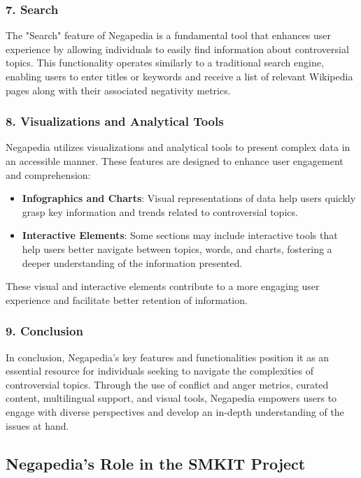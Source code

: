 \subsubsection{7. Search}

The "Search" feature of Negapedia is a fundamental tool that enhances user experience by allowing individuals to easily find information about controversial topics. This functionality operates similarly to a traditional search engine, enabling users to enter titles or keywords and receive a list of relevant Wikipedia pages along with their associated negativity metrics.

\subsubsection{8. Visualizations and Analytical Tools}

Negapedia utilizes visualizations and analytical tools to present complex data in an accessible manner. These features are designed to enhance user engagement and comprehension:

\begin{itemize}
    \item \textbf{Infographics and Charts}: Visual representations of data help users quickly grasp key information and trends related to controversial topics.
    \item \textbf{Interactive Elements}: Some sections may include interactive tools that help users better navigate between topics, words, and charts, fostering a deeper understanding of the information presented.
\end{itemize}

These visual and interactive elements contribute to a more engaging user experience and facilitate better retention of information.

\subsubsection{9. Conclusion}

In conclusion, Negapedia’s key features and functionalities position it as an essential resource for individuals seeking to navigate the complexities of controversial topics. Through the use of conflict and anger metrics, curated content, multilingual support, and visual tools, Negapedia empowers users to engage with diverse perspectives and develop an in-depth understanding of the issues at hand.

\subsection{Negapedia's Role in the SMKIT Project}
\label{subsec:negapedia_s_role_in_the_smkit_project}

